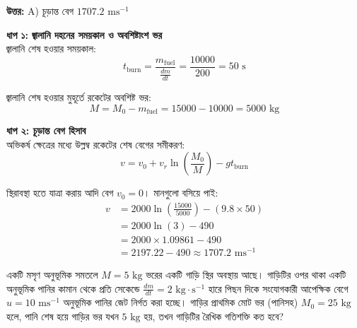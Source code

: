 \documentclass[12pt, a4paper]{article}
\begin{document}
{{\vspace{0.5em}
\begin{tcolorbox}[answerbox]
    \textbf{\color{success} উত্তর:} A) চূড়ান্ত বেগ $1707.2\text{ ms}^{-1}$
\end{tcolorbox}
\vspace{1em}

\begin{tcolorbox}[solutionbox={সমাধান (Solution)}]
    \noindent
    \textbf{ধাপ ১: জ্বালানি দহনের সময়কাল ও অবশিষ্টাংশ ভর} \\
    জ্বালানি শেষ হওয়ার সময়কাল:
    \[ t_{\text{burn}} = \frac{m_{\text{fuel}}}{\frac{dm}{dt}} = \frac{10000}{200} = 50\text{ s} \]
    
    জ্বালানি শেষ হওয়ার মুহূর্তে রকেটের অবশিষ্ট ভর:
    \[ M = M_0 - m_{\text{fuel}} = 15000 - 10000 = 5000\text{ kg} \]
    
    \vspace{0.5em}
    \noindent\textbf{ধাপ ২: চূড়ান্ত বেগ হিসাব} \\
    অভিকর্ষ ক্ষেত্রের মধ্যে উল্লম্ব রকেটের শেষ বেগের সমীকরণ:
    \[ v = v_0 + v_r \ln\left(\frac{M_0}{M}\right) - g t_{\text{burn}} \]
    
    স্থিরাবস্থা হতে যাত্রা করায় আদি বেগ $v_0 = 0$। মানগুলো বসিয়ে পাই:
    \begin{align*}
        v &= 2000 \ln\left(\frac{15000}{5000}\right) - (9.8 \times 50) \\
          &= 2000 \ln(3) - 490 \\
          &= 2000 \times 1.09861 - 490 \\
          &= 2197.22 - 490 \approx \mathbf{1707.2}\text{ ms}^{-1}
    \end{align*}
\end{tcolorbox}

\newpage

\begin{tcolorbox}[questionbox={প্রশ্ন (Question) 41}]
    \noindent
    একটি মসৃণ অনুভূমিক সমতলে $M = 5\text{ kg}$ ভরের একটি গাড়ি স্থির অবস্থায় আছে। গাড়িটির ওপর থাকা একটি অনুভূমিক পানির কামান থেকে প্রতি সেকেন্ডে $\frac{dm}{dt} = 2\text{ kg}\cdot\text{s}^{-1}$ হারে পিছন দিকে সংযোগকারী আপেক্ষিক বেগে $u = 10\text{ ms}^{-1}$ অনুভূমিক পানির জেট নির্গত করা হচ্ছে। গাড়ির প্রাথমিক মোট ভর (পানিসহ) $M_0 = 25\text{ kg}$ হলে, পানি শেষ হয়ে গাড়ির ভর যখন $5\text{ kg}$ হয়, তখন গাড়িটির রৈখিক গতিশক্তি কত হবে?
    

\end{tcolorbox}}}
\end{document}
